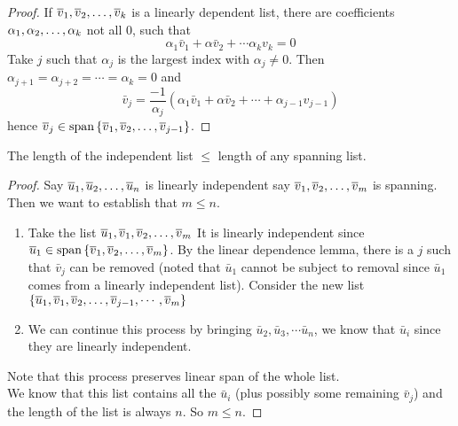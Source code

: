 \begin{proof}
    If ${\overline v}_1,{\overline v}_2, \ldots, {\overline v}_{k}$ is a linearly dependent list, there are coefficients ${\alpha}_1,{\alpha}_2, \ldots, {\alpha}_{k}$ not all $0$, such that 
    \[ \alpha_1 \bar v_1 + \alpha \bar v_2 + \cdots \alpha_k v_k = 0\]
    Take $j$ such that $\alpha_j$ is the largest index with $\alpha_j \neq 0$. Then $\alpha_{j + 1}=  \alpha_{j + 2} = \cdots = \alpha_k = 0$ and \[ \bar v_j = \frac{-1}{\alpha_j} (\alpha_1 \bar v_1 + \alpha \bar v_2 + \cdots + \alpha_{j - 1} v_{j-1})\] hence $\overline v_j \in \text{span} \left\{ {\overline v}_1,{\overline v}_2, \ldots, {\overline v}_{j-1} \right\}$.
\end{proof}
\begin{remark}
    The length of the independent list $\leq$ length of any spanning list. 
\end{remark}
\begin{proof}
    Say ${\overline u}_1,{\overline u}_2, \ldots, {\overline u}_{n}$ is linearly independent say ${\overline v}_1,{\overline v}_2, \ldots, {\overline v}_{m}$ is spanning. Then we want to establish that $ m \leq n$. 
    \begin{enumerate}[label = {Step \arabic*.}]
        \item Take the list $\overline u_1, {\overline v}_1,{\overline v}_2, \ldots, {\overline v}_{m}$ It is linearly independent since $\overline u_1 \in \text{span} \left\{ {\overline v}_1,{\overline v}_2, \ldots, {\overline v}_{m} \right\}$. By the linear dependence lemma, there is a $j$ such that $\bar v_j$ can be removed (noted that $\bar u_1$ cannot be subject to removal since $\bar u_1$ comes from a linearly independent list). Consider the new list $\left\{ \overline u_1, {\overline v}_1,{\overline v}_2, \ldots, {\overline v}_{j-1} , \cdots, \overline v_m\right\}$
        \item We can continue this process by bringing $\bar u_2, \bar u_3, \cdots \bar u_n$, we know that $\bar u_i$ since they are linearly independent.
    \end{enumerate}
    Note that this process preserves linear span of the whole list.  \\
    We know that this list contains all the $\bar u_i$ (plus possibly some remaining $\bar v_j$) and the length of the list is always $n$. So $\boxed{m \leq n}$.
\end{proof}
